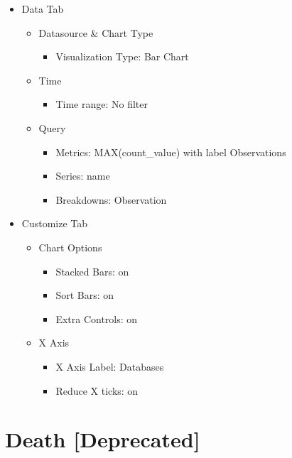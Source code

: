 \documentclass[
]{book}
\providecommand{\tightlist}{%
  \setlength{\itemsep}{0pt}\setlength{\parskip}{0pt}}
\begin{document}
\begin{itemize}
\tightlist
\item
  Data Tab

  \begin{itemize}
  \tightlist
  \item
    Datasource \& Chart Type

    \begin{itemize}
    \tightlist
    \item
      Visualization Type: Bar Chart
    \end{itemize}
  \item
    Time

    \begin{itemize}
    \tightlist
    \item
      Time range: No filter
    \end{itemize}
  \item
    Query

    \begin{itemize}
    \tightlist
    \item
      Metrics: MAX(count\_value) with label Observations
    \item
      Series: name
    \item
      Breakdowns: Observation
    \end{itemize}
  \end{itemize}
\item
  Customize Tab

  \begin{itemize}
  \tightlist
  \item
    Chart Options

    \begin{itemize}
    \tightlist
    \item
      Stacked Bars: on
    \item
      Sort Bars: on
    \item
      Extra Controls: on
    \end{itemize}
  \item
    X Axis

    \begin{itemize}
    \tightlist
    \item
      X Axis Label: Databases
    \item
      Reduce X ticks: on
    \end{itemize}
  \end{itemize}
\end{itemize}

\hypertarget{death-deprecated}{%
\section{Death {[}Deprecated{]}}\label{death-deprecated}}
\end{document}
